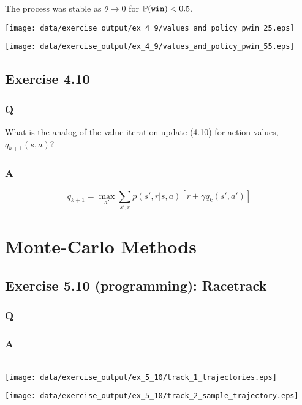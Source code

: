 The process was stable as $\theta \to 0$ for $\P{}(\mathtt{win}) < 0.5$.

\texttt{[image: data/exercise\_output/ex\_4\_9/values\_and\_policy\_pwin\_25.eps]}

\texttt{[image: data/exercise\_output/ex\_4\_9/values\_and\_policy\_pwin\_55.eps]}

\subsection{Exercise 4.10}
\subsubsection{Q}
What is the analog of the value iteration update (4.10) for action values, $q_{k+1}(s, a)$?

\subsubsection{A}
\begin{equation}
    q_{k+1} = \max_{a'} \sum_{s', r} p(s', r| s, a)\left[r + \gamma q_k(s', a')\right]
\end{equation}


\clearpage
\section{Monte-Carlo Methods}

\subsection{Exercise 5.10 (programming): Racetrack}
\subsubsection{Q}
\subsubsection{A}
\ProgrammingExercise\\
\texttt{[image: data/exercise\_output/ex\_5\_10/track\_1\_trajectories.eps]}

\texttt{[image: data/exercise\_output/ex\_5\_10/track\_2\_sample\_trajectory.eps]}
